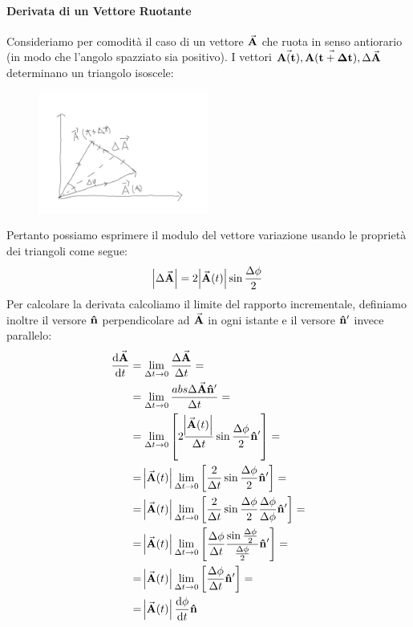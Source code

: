 \documentclass{report}
\newcommand{\normvs}{\vu{n}}
\newcommand{\A}{\va{A}}
\begin{document}
\paragraph{Derivata di un Vettore Ruotante}
Consideriamo per comodità il caso di un vettore $\va{A}$ che ruota in senso antiorario (in modo che l'angolo spazziato sia positivo). I vettori $\va{A(t)},\va{A(t+\Delta t)},\Delta \va{A}$ determinano un triangolo isoscele:
\begin{figure}[H]
    \centering
    \includegraphics[width=0.5\textwidth]{VettRuotante.png}
\end{figure}
Pertanto possiamo esprimere il modulo del vettore variazione usando le proprietà dei triangoli come segue:
\[\abs{\Delta\va{A}}=2\abs{\A(t)}\sin\frac{\Delta\phi}{2}\]
Per calcolare la derivata calcoliamo il limite del rapporto incrementale, definiamo inoltre il versore $\normvs$ perpendicolare ad $\A$ in ogni istante e il versore $\normvs'$ invece parallelo:
\begin{equation}
\begin{split}
    \dv{\A}{t}&=\lim\limits_{\Delta t\to0}\frac{\Delta\A}{\Delta t}=\\
    &=\lim\limits_{\Delta t\to0}\frac{abs{\Delta\A}\normvs'}{\Delta t}=\\
    &=\lim\limits_{\Delta t\to0}\left[2\frac{\abs{\A(t)}}{\Delta t}\sin\frac{\Delta\phi}{2}\normvs'\right]=\\
    &=\abs{\A(t)}\lim\limits_{\Delta t\to0}\left[\frac{2}{\Delta t}\sin\frac{\Delta\phi}{2}\normvs'\right]=\\
    &=\abs{\A(t)}\lim\limits_{\Delta t\to0}\left[\frac{2}{\Delta t}\sin\frac{\Delta\phi}{2}\frac{\Delta\phi}{\Delta\phi}\normvs'\right]=\\
    &=\abs{\A(t)}\lim\limits_{\Delta t\to0}\left[\frac{\Delta\phi}{\Delta t}\frac{\sin\frac{\Delta\phi}{2}}{\frac{\Delta\phi}{2}}\normvs'\right]=\\
    &=\abs{\A(t)}\lim\limits_{\Delta t\to0}\left[\frac{\Delta\phi}{\Delta t}\normvs'\right]=\\
    &=\abs{\A(t)}\dv{\phi}{t}\normvs
\end{split}
\end{equation}
\end{document}
